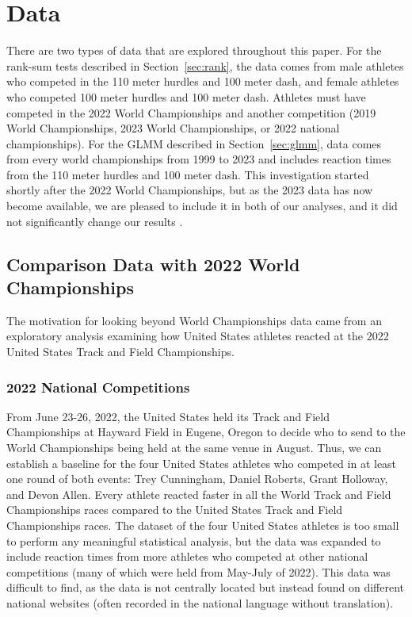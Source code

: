 \documentclass[12pt, letterpaper]{article}
\begin{document}
\section{Data} \label{sec:Data}

There are two types of data that are explored throughout this paper. For the
rank-sum tests described in Section~\ref{sec:rank}, the data comes from male 
athletes who competed in the 110 meter hurdles and 100 meter dash, and female
athletes who competed 100 meter hurdles and 100 meter dash.
Athletes must have competed in the 2022 World Championships and another competition 
(2019 World Championships, 2023 World Championships, or 2022 national 
championships). For the GLMM described in Section~\ref{sec:glmm}, data comes
from every world championships from 1999 to 2023 and includes reaction times from
the 110 meter hurdles and 100 meter dash. This investigation started 
shortly after the 2022 World Championships, but as the 2023 data has now become 
available, we are pleased to include it in both of our analyses, and it did not
significantly change our results \citep{WAData}. 


\subsection{Comparison Data with 2022 World Championships}
\label{sec:databeyond}

The motivation for looking beyond World Championships data came from an 
exploratory analysis examining how United States athletes reacted at the 
2022 United States Track and Field Championships.


\subsubsection{2022 National Competitions}\label{sec:datanational}
From June 23-26, 2022, the United States held its Track and Field Championships 
at Hayward Field in Eugene, Oregon to decide who to send to the World 
Championships being held at the same venue in August. Thus, we can establish a 
baseline for the four United States athletes who competed in at least one round 
of both events: Trey Cunningham, Daniel Roberts, Grant Holloway, and Devon Allen.  
Every athlete reacted faster in all the World Track and Field Championships 
races compared to the United States Track and Field Championships races. The 
dataset of the four United States athletes is too small to perform any 
meaningful statistical analysis, but the data was expanded to include reaction 
times from more athletes who competed at other national competitions (many of which were 
held from May-July of 2022). This data was difficult to find, as the data is not
centrally located but instead found on different national websites (often 
recorded in the national language without translation).
\end{document}
